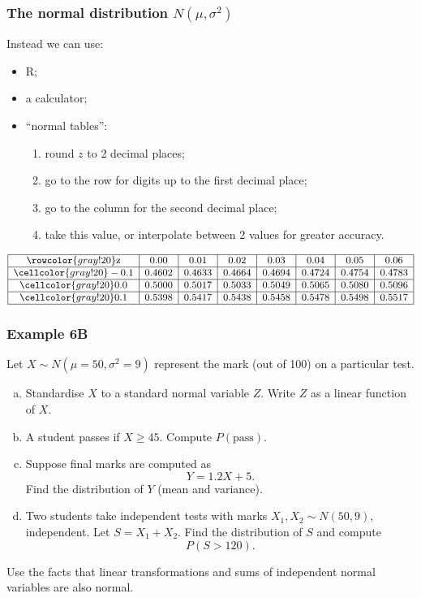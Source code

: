 \documentclass[t,8pt]{beamer}
\begin{document}
\begin{frame}
	\frametitle{The normal distribution $N(\mu,\sigma^2)$}
	
	Instead we can use:
	\begin{itemize}
		\item R;
		\item a calculator;
		\item ``normal tables'':
		\begin{enumerate}
			\item round $z$ to 2 decimal places;
			\item go to the row for digits up to the first decimal place;
			\item go to the column for the second decimal place;
			\item take this value, or interpolate between 2 values for greater accuracy.
		\end{enumerate}
	\end{itemize}
	
	\[
	\small
	\begin{array}{|c|c|c|c|c|c|c|c|}
		\hline
		\rowcolor{gray!20} \text{z} & 0.00 & 0.01 & 0.02 & 0.03 & 0.04 & 0.05 & 0.06 \\
		\hline
		\cellcolor{gray!20} -0.1 & 0.4602 & 0.4633 & 0.4664 & 0.4694 & 0.4724 & 0.4754 & 0.4783 \\
		\hline
		\cellcolor{gray!20} 0.0  & 0.5000 & 0.5017 & 0.5033 & 0.5049 & 0.5065 & 0.5080 & 0.5096 \\
		\hline
		\cellcolor{gray!20} 0.1  & 0.5398 & 0.5417 & 0.5438 & 0.5458 & 0.5478 & 0.5498 & 0.5517 \\
		\hline
	\end{array}
	\]
\end{frame}

\begin{frame}
	\frametitle{Example 6B}
	
	Let $X \sim N(\mu=50,\sigma^2=9)$ represent the mark (out of 100)
	on a particular test.
	
	\begin{enumerate}[(a)]
		\item Standardise $X$ to a standard normal variable $Z$.
		Write $Z$ as a linear function of $X$.
		\item A student passes if $X \ge 45$. Compute $P(\text{pass})$.
		\item Suppose final marks are computed as 
		\[
		Y = 1.2X + 5.
		\]
		Find the distribution of $Y$ (mean and variance).
		\item Two students take independent tests with marks
		$X_1,X_2 \sim N(50,9)$, independent. Let $S = X_1 + X_2$.
		Find the distribution of $S$ and compute
		\[
		P(S > 120).
		\]
	\end{enumerate}
	
	{\small\color{NavyBlue} Use the facts that linear transformations and sums
		of independent normal variables are also normal.}
\end{frame}
\end{document}
